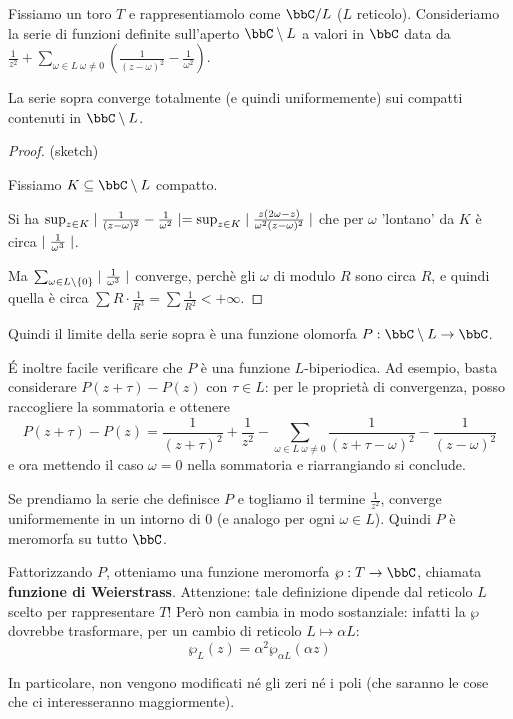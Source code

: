 Fissiamo un toro $T$ e rappresentiamolo come $\bbC/L$ ($L$ reticolo).
Consideriamo la serie di funzioni definite sull'aperto $\bbC\setminus L$ a valori in $\bbC$ data da $\frac{1}{z^2}+\sum_{\omega\in L\ \omega\not=0}(\frac{1}{(z-\omega)^2}-\frac{1}{\omega^2})$.

\begin{proposizione}
La serie sopra converge totalmente (e quindi uniformemente) sui compatti contenuti in $\bbC\setminus L$.
\end{proposizione}
\begin{proof}(sketch)

Fissiamo $K\subseteq\bbC\setminus L$ compatto.

Si ha $\sup_{z\in K}\mid \frac{1}{(z-\omega)^2}-\frac{1}{\omega^2} \mid=\sup_{z\in K}\mid \frac{z(2\omega-z)}{\omega^2(z-\omega)^2} \mid$ che per $\omega$ 'lontano' da $K$ è circa $\mid \frac{1}{\omega^3} \mid$.

Ma $\sum_{\omega\in L\setminus\{0\}}\mid \frac{1}{\omega^3} \mid$ converge, perchè
gli $\omega$ di modulo $R$ sono circa $R$, e quindi quella è circa $\sum R\cdot\frac{1}{R^3}=\sum\frac{1}{R^2}<+\infty$.
\end{proof}

Quindi il limite della serie sopra è una funzione olomorfa $P:\bbC\setminus L\rar\bbC$.

\'E inoltre facile verificare che $P$ è una funzione $L$-biperiodica.
Ad esempio, basta considerare $P(z+\tau)-P(z)$ con $\tau \in L$: per le proprietà di convergenza, posso raccogliere la sommatoria e ottenere 
\[ P(z+\tau) - P(z) = \frac1{(z+\tau)^2} + \frac1{z^2} - \sum_{\omega \in L\ \omega\ne 0} \frac1{(z+\tau-\omega)^2}-\frac1{(z-\omega)^2}\]
e ora mettendo il caso $\omega=0$ nella sommatoria e riarrangiando si conclude.

Se prendiamo la serie che definisce $P$ e togliamo il termine $\frac{1}{z^2}$, converge uniformemente in un intorno di $0$ (e analogo per ogni $\omega\in L$).
Quindi $P$ è meromorfa su tutto $\bbC$.

Fattorizzando $P$, otteniamo una funzione meromorfa $\wp:T\rar\bbC$, chiamata \textbf{funzione di Weierstrass}. Attenzione: tale definizione dipende dal reticolo $L$ scelto per rappresentare $T$! Però non cambia in modo sostanziale: infatti la $\wp$ dovrebbe trasformare, per un cambio di reticolo $L \mapsto \alpha L$:
\[
 \wp_L(z) = \alpha^2 \wp_{\alpha L}(\alpha z) 
\]

In particolare, non vengono modificati né gli zeri né i poli (che saranno le cose che ci interesseranno maggiormente).


